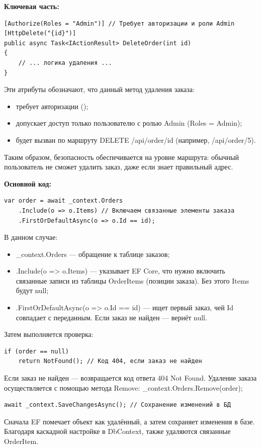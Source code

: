 \documentclass[12pt]{article}
\renewcommand{\texttt}[1]{{\small\ttfamily #1}}
\numberwithin{listing}{section}
\numberwithin{figure}{section}
\begin{document}
\noindent \textbf{Ключевая часть:}
\begin{verbatim}
[Authorize(Roles = "Admin")] // Требует авторизации и роли Admin
[HttpDelete("{id}")]
public async Task<IActionResult> DeleteOrder(int id)
{
    // ... логика удаления ...
}
\end{verbatim}
Эти атрибуты обозначают, что данный метод удаления заказа:
\begin{itemize}
	\item требует авторизации (\texttt{[Authorize]});
	\item допускает доступ только пользователю с ролью Admin (\texttt{Roles = Admin});
	\item будет вызван по маршруту DELETE \texttt{/api/order/{id}} (например, \texttt{/api/order/5}).
\end{itemize}
Таким образом, безопасность обеспечивается на уровне маршрута: обычный пользователь не сможет удалить заказ, даже если знает правильный адрес.

\noindent \textbf{Основной код:}
\begin{verbatim}
var order = await _context.Orders
    .Include(o => o.Items) // Включаем связанные элементы заказа
    .FirstOrDefaultAsync(o => o.Id == id);
\end{verbatim}
В данном случае:
\begin{itemize}
	\item \texttt{\_context.Orders} — обращение к таблице заказов;
	\item \texttt{.Include(o => o.Items)} — указывает EF Core, что нужно включить связанные записи из таблицы \texttt{OrderItems} (позиции заказа). Без этого \texttt{Items} будут \texttt{null};
	\item \texttt{.FirstOrDefaultAsync(o => o.Id == id)} — ищет первый заказ, чей Id совпадает с переданным. Если заказ не найден — вернёт \texttt{null}.
\end{itemize}
Затем выполняется проверка:
\begin{verbatim}
if (order == null)
    return NotFound(); // Код 404, если заказ не найден
\end{verbatim}
Если заказ не найден — возвращается код ответа 404 Not Found.
Удаление заказа осуществляется с помощью метода \texttt{Remove}: \texttt{\_context.Orders.Remove(order);}
\begin{verbatim}
await _context.SaveChangesAsync(); // Сохранение изменений в БД
\end{verbatim}
Сначала EF помечает объект как удалённый, а затем сохраняет изменения в базе. Благодаря каскадной настройке в DbContext, также удаляются связанные \texttt{OrderItem}.
\end{document}
